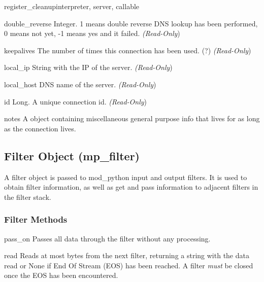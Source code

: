 \begin{funcdesc}{register_cleanup}{interpreter, server, callable}
\begin{memberdesc}[connection]{double_reverse}
  Integer. 1 means double reverse DNS lookup has been performed, 0 means
  not yet, -1 means yes and it failed.
  \emph{(Read-Only})
\end{memberdesc}

\begin{memberdesc}[connection]{keepalives}
  The number of times this connection has been used. (?)
  \emph{(Read-Only})
\end{memberdesc}

\begin{memberdesc}[connection]{local_ip}
  String with the IP of the server.
  \emph{(Read-Only})
\end{memberdesc}

\begin{memberdesc}[connection]{local_host}
  DNS name of the server.
  \emph{(Read-Only})
\end{memberdesc}

\begin{memberdesc}[connection]{id}
  Long. A unique connection id.
  \emph{(Read-Only})
\end{memberdesc}

\begin{memberdesc}[connection]{notes}
  A  object containing miscellaneous general purpose info that lives for
  as long as the connection lives. 
\end{memberdesc}

\subsection{Filter Object (mp_filter)\label{pyapi-mpfilt}}

A filter object is passed to mod_python input and output filters. It
is used to obtain filter information, as well as get and pass
information to adjacent filters in the filter stack.

\subsubsection{Filter Methods\label{pyapi-mpfilt-meth}}

\begin{methoddesc}[filter]{pass_on}{}
  Passes all data through the filter without any processing.
\end{methoddesc}

\begin{methoddesc}[filter]{read}{}
  Reads at most  bytes from the next filter, returning a string
  with the data read or None if End Of Stream (EOS) has been reached. A
  filter \emph{must} be closed once the EOS has been encountered.


\end{methoddesc}
\end{funcdesc}

